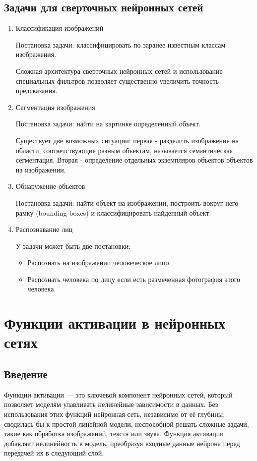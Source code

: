{\subsection{Задачи для сверточных нейронных сетей}

\begin{enumerate}
\item Классификация изображений

Постановка задачи: классифицировать по заранее известным классам изображения.

Сложная архитектура сверточных нейронных сетей и использование специальных фильтров позволяет
существенно увеличить точность предсказания.

\item Сегментация изображения

Постановка задачи: найти на картинке определенный объект.

Существует две возможных ситуации: первая - разделить изображение на области, соответствующие
разным объектам, называется семантическая сегментация. Вторая - определение отдельных экземпляров
объектов объектов на изображении.

\item Обнаружение объектов

Постановка задачи: найти объект на изображении, построить вокруг него рамку (bounding boxes) и
классифицировать найденный объект.

\item Распознавание лиц

У задачи может быть две постановки:
\begin{itemize}
\item Распознать на изображении человеческое лицо.
\item Распознать человека по лицу если есть размеченная фотография этого человека.
\end{itemize}
\end{enumerate}


\section*{Функции активации в нейронных сетях}

\subsection*{Введение}
Функции активации — это ключевой компонент нейронных сетей, который позволяет моделям улавливать нелинейные зависимости в данных. Без использования этих функций нейронная сеть, независимо от её глубины, сводилась бы к простой линейной модели, неспособной решать сложные задачи, такие как обработка изображений, текста или звука. Функция активации добавляет нелинейность в модель, преобразуя входные данные нейрона перед передачей их в следующий слой.

}
